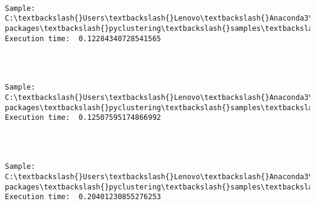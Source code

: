 \documentclass[11pt]{article}
\begin{document}
    \begin{center}
    \end{center}
    { \hspace*{\fill} \\}
    
    \begin{Verbatim}[commandchars=\\\{\}]
Sample:  C:\textbackslash{}Users\textbackslash{}Lenovo\textbackslash{}Anaconda3\textbackslash{}lib\textbackslash{}site-packages\textbackslash{}pyclustering\textbackslash{}samples\textbackslash{}samples\textbackslash{}fcps\textbackslash{}TwoDiamonds.data 		Execution time:  0.12284340728541565 


    \end{Verbatim}

    \begin{center}
    \end{center}
    { \hspace*{\fill} \\}
    
    \begin{Verbatim}[commandchars=\\\{\}]
Sample:  C:\textbackslash{}Users\textbackslash{}Lenovo\textbackslash{}Anaconda3\textbackslash{}lib\textbackslash{}site-packages\textbackslash{}pyclustering\textbackslash{}samples\textbackslash{}samples\textbackslash{}fcps\textbackslash{}WingNut.data 		Execution time:  0.12507595174866992 


    \end{Verbatim}

    \begin{center}
    \end{center}
    { \hspace*{\fill} \\}
    
    \begin{Verbatim}[commandchars=\\\{\}]
Sample:  C:\textbackslash{}Users\textbackslash{}Lenovo\textbackslash{}Anaconda3\textbackslash{}lib\textbackslash{}site-packages\textbackslash{}pyclustering\textbackslash{}samples\textbackslash{}samples\textbackslash{}fcps\textbackslash{}Chainlink.data 		Execution time:  0.20401230855276253 


    \end{Verbatim}
\end{document}

